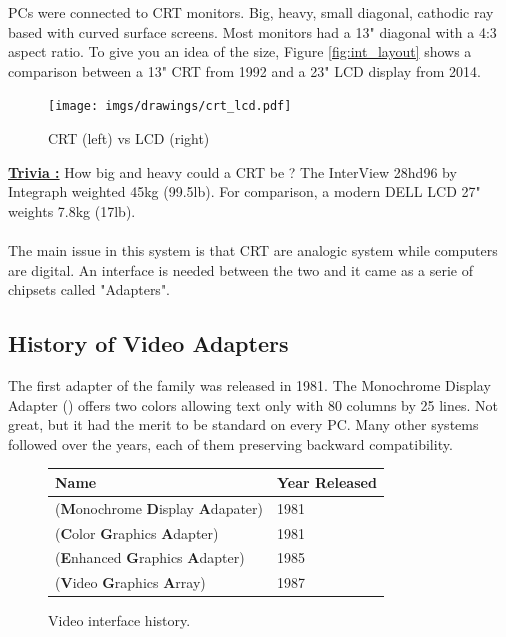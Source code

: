 \documentclass[book.tex]{subfiles}
\begin{document}
PCs were connected to CRT monitors. Big, heavy, small diagonal, cathodic ray based with curved surface screens. Most monitors had a 13" diagonal with a 4:3 aspect ratio. To give you an idea of the size, Figure \ref{fig:int_layout} shows a comparison between a 13" CRT from 1992 and a 23" LCD display from 2014.\\

\begin{figure}[H]
\centering
\texttt{[image: imgs/drawings/crt\_lcd.pdf]}
\caption{CRT (left) vs LCD (right)}
\label{fig:lcd_vs_crt}
\end{figure}

\textbf{\underline{Trivia :}} How big and heavy could a CRT be ? The InterView 28hd96 by Integraph weighted 45kg (99.5lb). For comparison, a modern DELL LCD 27" weights 7.8kg (17lb).\\
\\
The main issue in this system is that CRT are analogic system while computers are digital. An interface is needed between the two and it came as a serie of chipsets called "Adapters". 

  \subsection{History of Video Adapters}

The first adapter of the family was released in 1981. The Monochrome Display
   Adapter () offers two colors allowing text only with 80 columns by 25 lines.  Not great, but it had the merit to be standard on every PC. Many other systems followed over the years, each of them preserving backward compatibility.
\bigskip
  
 \begin{figure}[H]
\centering  
\begin{tabularx}{\textwidth}{ X  Y }
  \toprule
  \textbf{Name} &  \textbf{Year Released} \\
  \toprule {}
   (\textbf{M}onochrome
   \textbf{D}isplay
   \textbf{A}dapater) & 1981 
   \\ 
   (\textbf{C}olor
   \textbf{G}raphics
   \textbf{A}dapter) & 1981 
    \\ 
   (\textbf{E}nhanced
   \textbf{G}raphics
   \textbf{A}dapter) & 1985
   \\ 
   (\textbf{V}ideo
   \textbf{G}raphics
   \textbf{A}rray)  & 1987
    \\
  \toprule
\end{tabularx}
\caption{Video interface history.}\label{fig:vga_history}
\end{figure}
\end{document}

